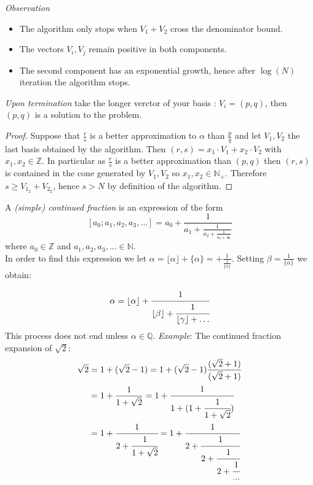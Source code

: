 \documentclass[a4paper,11pt,american]{article}
\newcommand{\N}{\mathbb{N}}
\newcommand{\Q}{\mathbb{Q}}
\newcommand{\R}{\mathbb{R}}
\newcommand{\Z}{\mathbb{Z}}
\theoremstyle{plain}
\theoremstyle{definition}
\begin{document}
\emph{Observation}\begin{itemize}
    \item The algorithm only stops when $V_1+V_2$ cross the denominator bound.
    \item The vectors $V_i,V_j$ remain positive in both components.
    \item The second component has an exponential growth, hence after $\log(N)$ iteration the algorithm stops.
\end{itemize}
\emph{Upon termination} take the longer verctor of your basis : $V_i=(p,q)$, then $(p,q)$ is a solution to the problem.
\begin{proof}
    Suppose that $\frac{r}{s}$ is a better approximation to $\alpha$ than $\frac{p}{q}$ and let $V_1,V_2$ the last basis obtained by the algorithm. Then $(r,s)=x_1\cdot V_1+ x_2\cdot V_2$ with $x_1,x_2\in\Z$. In particular as $\frac{r}{s}$ is a better approximation than $(p,q)$ then $(r,s)$ is contained in the cone generated by $V_1,V_2$ so $x_1,x_2\in \N_+$. Therefore $s\geq V_{1_2}+V_{2_2}$, hence $s>N$ by definition of the algorithm. 
\end{proof}
A \emph{(simple) continued fraction} is an expression of the form
\begin{equation}
\label{eqn_simple_continued_fraction}    
[a_0; a_1,a_2,a_3,\ldots]=a_0+\frac{1}{a_1+\frac{1}{a_2+\frac{1}{a_3+\frac{1}{~~\ddots}}}}
\end{equation}
where $a_0\in \Z$ and $a_1,a_2,a_3,\ldots\in\N$.\\
In order to find this expression we let $\alpha =  \lfloor\alpha\rfloor + \{\alpha\}= + \frac{1}{\frac{1}{\{\alpha\}}} $. Setting $\beta = \frac{1}{\{\alpha\}}$ we obtain:
 
  \begin{displaymath}
    \alpha = \lfloor\alpha\rfloor + \cfrac{1}{ \lfloor\beta\rfloor + \cfrac{1}{\lfloor\gamma\rfloor+ \dots}} 
  \end{displaymath}
This process does not end unless $\alpha \in\Q$.
\emph{Example}: The continued fraction expansion of $\sqrt{2}$:\begin{align*}
    \sqrt{2}&=1+(\sqrt{2}-1)=1+(\sqrt{2}-1)\dfrac{(\sqrt{2}+1)}{(\sqrt{2}+1)}\\
    &=1+\dfrac{1}{1+\sqrt{2}}=1+\cfrac{1}{1+(1+\cfrac{1}{1+\sqrt{2}})}\\
    &=1+\cfrac{1}{2+\cfrac{1}{1+\sqrt{2}}}=1+\cfrac{1}{2+\cfrac{1}{2+\cfrac{1}{2+\cfrac{1}{...}}}}
\end{align*}
\end{document}
